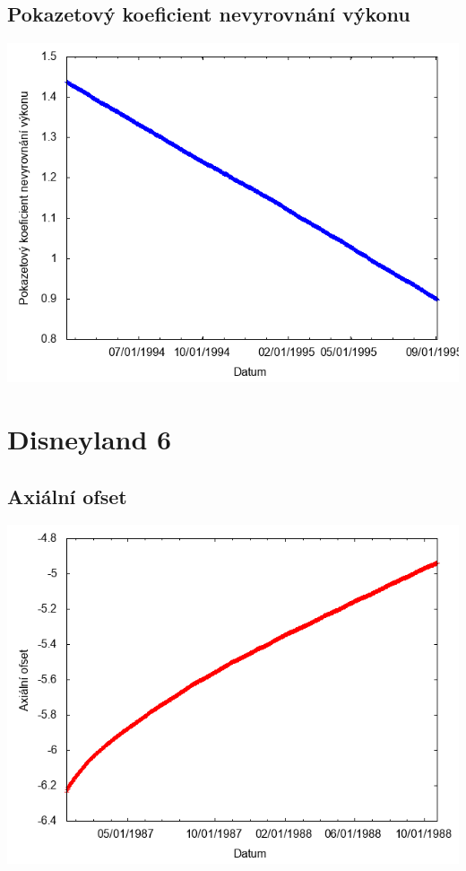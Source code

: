 \documentclass[a4paper,twoside,11pt]{article}
\begin{document}
\subsection*{Pokazetový koeficient nevyrovnání výkonu}
\begin{center}
\includegraphics[width=.8\textwidth]{graphs/Disneyland_05_fha.png}
\end{center}

\newpage
\section*{Disneyland 6}
\subsection*{Axiální ofset}
\begin{center}
\includegraphics[width=.8\textwidth]{graphs/Disneyland_06_ao.png}
\end{center}
\end{document}
